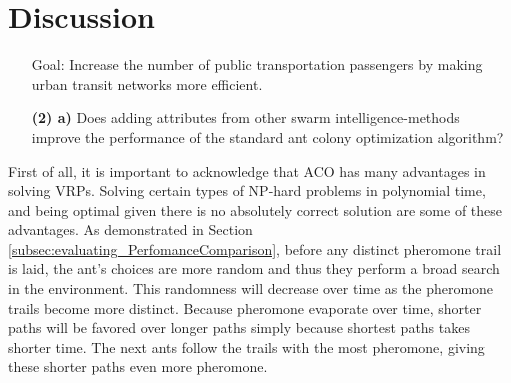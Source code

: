 \section{Discussion}
\begin{itemize}
\item[Goal:]  Increase the number of public transportation passengers by making urban transit networks more efficient.
\end{itemize}

\begin{itemize}
\item[\textbf{(2) a)}] Does adding attributes from other swarm intelligence-methods improve the performance of the standard ant colony optimization algorithm?
\end{itemize}

First of all, it is important to acknowledge that ACO has many advantages in solving VRPs. Solving certain types of NP-hard problems in polynomial time, and being optimal given there is no absolutely correct solution are some of these advantages. As demonstrated in Section \vref{subsec:evaluating_PerfomanceComparison}, before any distinct pheromone trail is laid, the ant's choices are more random and thus they perform a broad search in the environment. This randomness will decrease over time as the pheromone trails become more distinct. Because pheromone evaporate over time, shorter paths will be favored over longer paths simply because shortest paths takes shorter time. The next ants follow the trails with the most pheromone, giving these shorter paths even more pheromone. 


